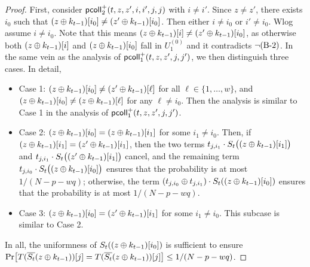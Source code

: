 \begin{proof}
	
	First, consider $\mathsf{pcoll}_{2}^+(t,z,z',i,i',j,j)$ with $i\neq i'$. Since $z\neq z'$, there exists $i_0$ such that $(z\oplus k_{t-1})[i_0]\neq(z'\oplus k_{t-1})[i_0]$. Then either $i\neq i_0$ or $i'\neq i_0$. Wlog assume $i\neq i_0$. Note that this means $(z\oplus k_{t-1})[i]\neq(z'\oplus k_{t-1})[i_0]$, as otherwise both $(z\oplus k_{t-1})[i]$ and $(z\oplus k_{t-1})[i_0]$ fall in $U_1^{(0)}$ and it contradicts $\neg\text{(B-2)}$. In the same vein as the analysis of $\mathsf{pcoll}_{1}^+(t,z,z',j,j')$, we then distinguish three cases. In detail,
	\begin{itemize}
		\item Case 1: $(z\oplus k_{t-1})[i_0]\neq(z'\oplus k_{t-1})[\ell]$ for all $\ell\in\{1,\ldots,w\}$, and $(z\oplus k_{t-1})[i_0]\neq(z\oplus k_{t-1})[\ell]$ for any $\ell\neq i_0$. Then the analysis is similar to Case 1 in the analysis of $\mathsf{pcoll}_{1}^+(t,z,z',j,j')$.
		\item Case 2: $(z\oplus k_{t-1})[i_0]=(z\oplus k_{t-1})[i_1]$ for some $i_1\neq i_0$. Then, if $(z\oplus k_{t-1})[i_1]=(z'\oplus k_{t-1})[i_1]$, then the two terms $t_{j,i_1}\cdot S_t\big((z\oplus k_{t-1})[i_1]\big)$ and $t_{j,i_1}\cdot S_t\big((z'\oplus k_{t-1})[i_1]\big)$ cancel, and the remaining term $t_{j,i_0}\cdot S_t\big((z\oplus k_{t-1})[i_0]\big)$ ensures that the probability is at most $1/(N-p-wq)$; otherwise, the term $(t_{j,i_0}\oplus t_{j,i_1})\cdot S_t((z\oplus k_{t-1})[i_0])$ ensures that the probability is at most $1/(N-p-wq)$.
		\item Case 3: $(z\oplus k_{t-1})[i_0]=(z'\oplus k_{t-1})[i_1]$ for some $i_1\neq i_0$. This subcase is similar to Case 2.
	\end{itemize}
	In all, the uniformness of $S_t((z\oplus k_{t-1})[i_0])$ is sufficient to ensure ${\Pr}\big[T(\overline{S_t}(z\oplus k_{t-1}))[j]=T(\overline{S_t}(z\oplus k_{t-1}))[j]\big]\leq1/(N-p-wq)$.
	
	
	
	\arrangespace
	

\end{proof}
